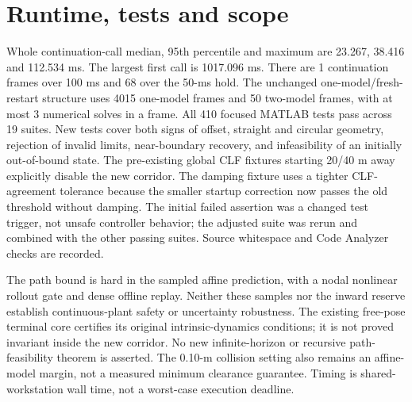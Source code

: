 \documentclass[10pt]{article}
\begin{document}
\section{Runtime, tests and scope}
Whole continuation-call median, 95th percentile and maximum are 23.267, 38.416 and 112.534 ms. The largest first call is 1017.096 ms. There are 1 continuation frames over 100 ms and 68 over the 50-ms hold. The unchanged one-model/fresh-restart structure uses 4015 one-model frames and 50 two-model frames, with at most 3 numerical solves in a frame.
All 410 focused MATLAB tests pass across 19 suites. New tests cover both signs
of offset, straight and circular geometry, rejection of invalid limits,
near-boundary recovery, and infeasibility of an initially out-of-bound state.
The pre-existing global CLF fixtures starting 20/40 m away explicitly disable
the new corridor. The damping fixture uses a tighter CLF-agreement tolerance
because the smaller startup correction now passes the old threshold without
damping. The initial failed assertion was a changed test trigger, not unsafe
controller behavior; the adjusted suite was rerun and combined with the other
passing suites. Source whitespace and Code Analyzer checks are recorded.

The path bound is hard in the sampled affine prediction, with a nodal nonlinear
rollout gate and dense offline replay. Neither these samples nor the inward
reserve establish continuous-plant safety or uncertainty robustness. The
existing free-pose terminal core certifies its original intrinsic-dynamics
conditions; it is not proved invariant inside the new corridor. No new
infinite-horizon or recursive path-feasibility theorem is asserted. The 0.10-m
collision setting also remains an affine-model margin, not a measured minimum
clearance guarantee. Timing is shared-workstation wall time, not a worst-case
execution deadline.
\end{document}
